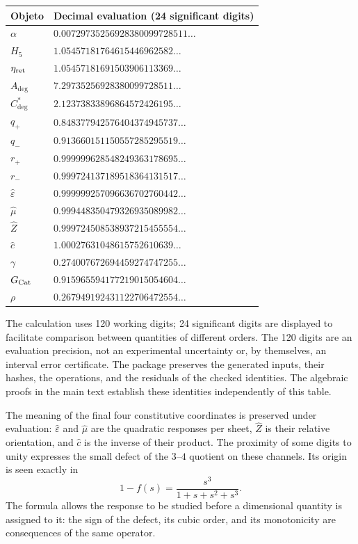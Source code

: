 \begin{longtable}{@{}ll@{}}
\toprule
Objeto & Decimal evaluation (24 significant digits)\\
\midrule\endhead
$\alpha$ & $0.00729735256928380099728511\ldots$ \\
$H_5$ & $1.05457181764615446962582\ldots$ \\
$\eta_{\rm ret}$ & $1.05457181691503906113369\ldots$ \\
$A_{\deg}$ & $7.29735256928380099728511\ldots$ \\
$C^*_{\deg}$ & $2.12373833896864572426195\ldots$ \\
$q_+$ & $0.848377942576404374945737\ldots$ \\
$q_-$ & $0.913660151150557285295519\ldots$ \\
$r_+$ & $0.999999628548249363178695\ldots$ \\
$r_-$ & $0.999724137189518364131517\ldots$ \\
$\widehat\varepsilon$ & $0.999999257096636702760442\ldots$ \\
$\widehat\mu$ & $0.999448350479326935089982\ldots$ \\
$\widehat Z$ & $0.999724508538937215455554\ldots$ \\
$\widehat c$ & $1.00027631048615752610639\ldots$ \\
$\gamma$ & $0.274007672694459274747255\ldots$ \\
$G_{\rm Cat}$ & $0.915965594177219015054604\ldots$ \\
$\rho$ & $0.267949192431122706472554\ldots$ \\
\bottomrule
\end{longtable}



The calculation uses 120 working digits; 24 significant
digits are displayed to facilitate comparison between quantities of different
orders. The 120 digits are an evaluation precision, not an experimental
uncertainty or, by themselves, an interval error certificate.
The package preserves the generated inputs, their hashes, the operations, and
the residuals of the checked identities. The algebraic proofs in the
main text establish these identities independently of this table.

The meaning of the final four constitutive coordinates is preserved
under evaluation: $\widehat\varepsilon$ and $\widehat\mu$ are the quadratic
responses per sheet, $\widehat Z$ is their relative orientation, and
$\widehat c$ is the inverse of their product. The proximity of some digits to
unity expresses the small defect of the $3$--$4$ quotient on these
channels. Its origin is seen exactly in
\[
 1-f(s)=\frac{s^3}{1+s+s^2+s^3}.
\]
The formula allows the response to be studied before a dimensional
quantity is assigned to it: the sign of the defect, its cubic order, and its monotonicity
are consequences of the same operator.


